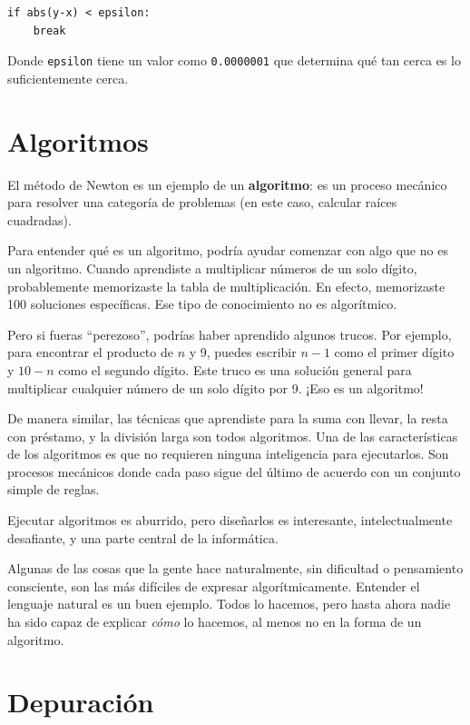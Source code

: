 \begin{lstlisting}
if abs(y-x) < epsilon:
    break
\end{lstlisting}

Donde \texttt{epsilon} tiene un valor como \texttt{0.0000001} que determina qué tan cerca es lo suficientemente cerca.

\section{Algoritmos}

El método de Newton es un ejemplo de un \textbf{algoritmo}: es un proceso mecánico para resolver una categoría de problemas (en este caso, calcular raíces cuadradas).

Para entender qué es un algoritmo, podría ayudar comenzar con algo que no es un algoritmo. Cuando aprendiste a multiplicar números de un solo dígito, probablemente memorizaste la tabla de multiplicación. En efecto, memorizaste 100 soluciones específicas. Ese tipo de conocimiento no es algorítmico.

Pero si fueras ``perezoso'', podrías haber aprendido algunos trucos. Por ejemplo, para encontrar el producto de $n$ y 9, puedes escribir $n - 1$ como el primer dígito y $10 - n$ como el segundo dígito. Este truco es una solución general para multiplicar cualquier número de un solo dígito por 9. ¡Eso es un algoritmo!

De manera similar, las técnicas que aprendiste para la suma con llevar, la resta con préstamo, y la división larga son todos algoritmos. Una de las características de los algoritmos es que no requieren ninguna inteligencia para ejecutarlos. Son procesos mecánicos donde cada paso sigue del último de acuerdo con un conjunto simple de reglas.

Ejecutar algoritmos es aburrido, pero diseñarlos es interesante, intelectualmente desafiante, y una parte central de la informática.

Algunas de las cosas que la gente hace naturalmente, sin dificultad o pensamiento consciente, son las más difíciles de expresar algorítmicamente. Entender el lenguaje natural es un buen ejemplo. Todos lo hacemos, pero hasta ahora nadie ha sido capaz de explicar \emph{cómo} lo hacemos, al menos no en la forma de un algoritmo.

\section{Depuración}

